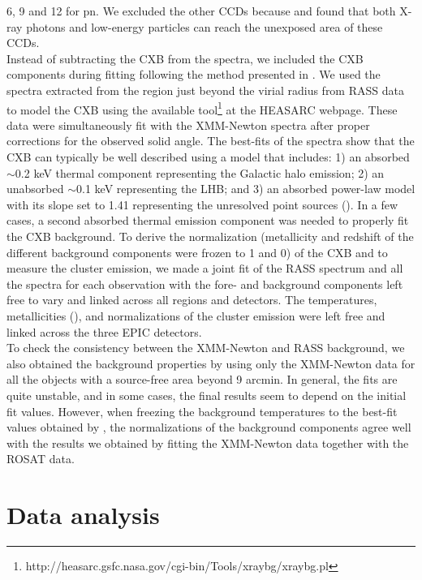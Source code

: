 \documentclass{aa} %
\begin{document}
6, 9 and 12 for pn. We excluded the other CCDs because
\citet{2004A&A...419..837D} and \citet{2008A&A...478..615S} found that
both X-ray photons and low-energy particles can reach the unexposed area of these CCDs.\\
Instead of subtracting the CXB from the spectra, we included the CXB
components during fitting following the method presented in
\citet{2008A&A...478..615S}. We used the spectra extracted from the
region just beyond the virial radius from RASS data to model the CXB
using the available tool\footnote
{http://heasarc.gsfc.nasa.gov/cgi-bin/Tools/xraybg/xraybg.pl} at
the HEASARC webpage. These data were simultaneously fit with the XMM-Newton
spectra after proper corrections for the observed solid angle. The
best-fits of the spectra show that the CXB can typically be well described using
a model that includes: 1) an absorbed $\sim$0.2 keV thermal component
representing the Galactic halo emission; 2) an unabsorbed $\sim$0.1
keV representing the LHB; and 3) an absorbed power-law model with its slope
set to 1.41 representing the unresolved point sources
(\citealt{2004A&A...419..837D}). In a few cases, a second absorbed
thermal emission component was needed to properly fit the CXB
background.  To derive the normalization (metallicity and redshift of the different background components were frozen to 1 and 0) of the CXB and to measure the
cluster emission, we made a joint fit of the RASS spectrum and
all the spectra for each observation with the fore- and background
components left free to vary and linked across all regions and
detectors. The temperatures, metallicities
(\citealt{2009ARA&A..47..481A}), and normalizations of the cluster
emission were left free and linked across the three EPIC detectors.\\
To check the consistency between the XMM-Newton and RASS background, we also obtained the background properties by using only the XMM-Newton data for all the objects with a source-free area beyond 9 arcmin. In general, the fits are quite unstable, and in some cases, the final results seem to depend on the initial fit values. However, when freezing the background temperatures to the best-fit values obtained by \cite{2000ApJ...543..195K}, the normalizations of the background components agree well with the results we obtained by fitting the XMM-Newton data together with the ROSAT data.


\section{Data analysis} \label{sec_dataanal}
\end{document}

